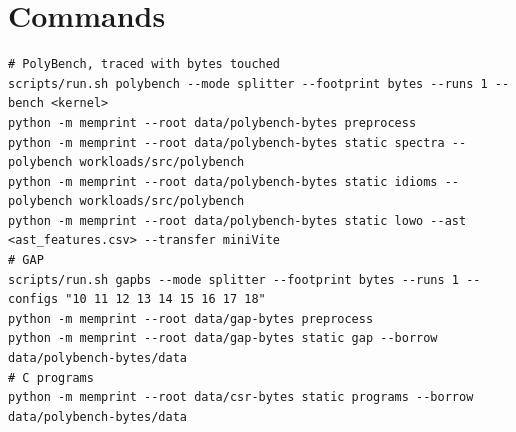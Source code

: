 \documentclass[11pt]{article}
\begin{document}
\section{Commands}
\begin{lstlisting}
# PolyBench, traced with bytes touched
scripts/run.sh polybench --mode splitter --footprint bytes --runs 1 --bench <kernel>
python -m memprint --root data/polybench-bytes preprocess
python -m memprint --root data/polybench-bytes static spectra --polybench workloads/src/polybench
python -m memprint --root data/polybench-bytes static idioms --polybench workloads/src/polybench
python -m memprint --root data/polybench-bytes static lowo --ast <ast_features.csv> --transfer miniVite
# GAP
scripts/run.sh gapbs --mode splitter --footprint bytes --runs 1 --configs "10 11 12 13 14 15 16 17 18"
python -m memprint --root data/gap-bytes preprocess
python -m memprint --root data/gap-bytes static gap --borrow data/polybench-bytes/data
# C programs
python -m memprint --root data/csr-bytes static programs --borrow data/polybench-bytes/data
\end{lstlisting}
\end{document}
